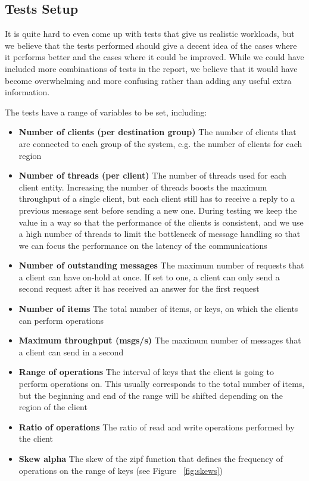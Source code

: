 \subsection{Tests Setup}\label{sec:tests-setup}
It is quite hard to even come up with tests that give us realistic workloads, but we believe that the tests performed should give a decent idea of the cases where it performs better and the cases where it could be improved. While we could have included more combinations of tests in the report, we believe that it would have become overwhelming and more confusing rather than adding any useful extra information.

The tests have a range of variables to be set, including:
\begin{itemize}
  \item \textbf{Number of clients (per destination group)} The number of clients that are connected to each group of the system, e.g. the number of clients for each region
  \item \textbf{Number of threads (per client)} The number of threads used for each client entity. Increasing the number of threads boosts the maximum throughput of a single client, but each client still has to receive a reply to a previous message sent before sending a new one. During testing we keep the value in a way so that the performance of the clients is consistent, and we use a high number of threads to limit the bottleneck of message handling so that we can focus the performance on the latency of the communications
  \item \textbf{Number of outstanding messages} The maximum number of requests that a client can have on-hold at once. If set to one, a client can only send a second request after it has received an answer for the first request
  \item \textbf{Number of items} The total number of items, or keys, on which the clients can perform operations
  \item \textbf{Maximum throughput (msgs/s)} The maximum number of messages that a client can send in a second
  \item \textbf{Range of operations} The interval of keys that the client is going to perform operations on. This usually corresponds to the total number of items, but the beginning and end of the range will be shifted depending on the region of the client
  \item \textbf{Ratio of operations} The ratio of read and write operations performed by the client
  \item \textbf{Skew alpha} The skew of the zipf function that defines the frequency of operations on the range of keys (see Figure ~\ref{fig:skews})
\end{itemize}

